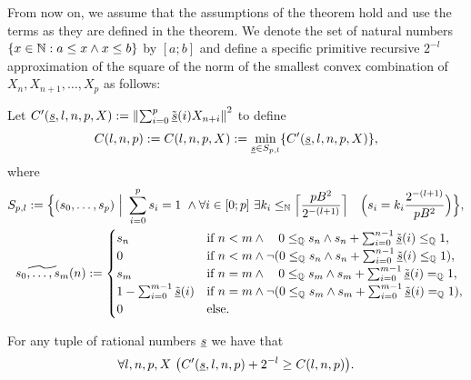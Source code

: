 From now on, we assume that the assumptions of the theorem hold and use the terms as they are defined in the theorem. 
We denote the set of natural numbers $\{x\in\mathbb{N} : a\leq x\wedge x\leq b\}$ by $[a;b]$ and define
a specific primitive recursive $2^{-l}$ approximation of the square of the norm of the smallest 
convex combination of $X_n, X_{n+1}, \ldots, X_p$ as follows:
\begin{dfn}[$C$]\label{d:C}  
Let $C'(\underline s, l,n,p, X) := \left\|\sum^{p}_{i=0} \tilde {\underline s}(i)X_{n+i}\right\|^2$ to define
\[
C(l,n,p) := C(l,n,p, X) := \min_{\underline s\in S_{p,l}}\{ C'(\underline s,l,n,p,X)\},
\] where
\begin{align*}
S_{p,l}:=\Big\{(s_0,\ldots,s_p)\ \Big|%
\ \sum^{p}_{i=0} s_i = 1 \ \wedge
 \forall i\in [0;p]\ \exists k_i\leq_\NN \Big\lceil\frac{pB^2}{2^{-(l+1)}}\Big\rceil\quad\Big( s_i=k_i\frac{2^{-(l+1)}}{pB^2}\Big)\Big\},\\
 \widetilde {s_0,\ldots,s_m}(n) := \begin{cases}
s_n&\Tif\ n< m\wedge \ \ \ 0\leq_\QQ s_n \wedge s_n+\sum^{n-1}_{i=0} \tilde {\tup s}(i) \leq_\QQ 1,\\
0&\Tif\ n< m\wedge \neg(   0\leq_\QQ s_n \wedge s_n+\sum^{n-1}_{i=0} \tilde {\tup s}(i) \leq_\QQ 1),\\
s_m&\Tif\ n= m\wedge \ \ \  0\leq_\QQ s_m \wedge s_m+\sum^{m-1}_{i=0} \tilde {\tup s}(i) =_\QQ 1,\\
1 - \sum^{m-1}_{i=0} \tilde{\tup s}(i)&\Tif\ n= m\wedge \neg(  0\leq_\QQ s_m \wedge s_m+\sum^{m-1}_{i=0} \tilde {\tup s}(i) =_\QQ 1),\\
0&\Telse.
\end{cases}\\
\end{align*}
\end{dfn}
\begin{lemma}\label{l:newC}
For any tuple of rational numbers $\underline s$ we have that
\[
\forall l,n,p,X\ \big( C'(\underline s,l,n,p)+2^{-l}\geq C(l,n,p) \big).
\]
\end{lemma}

